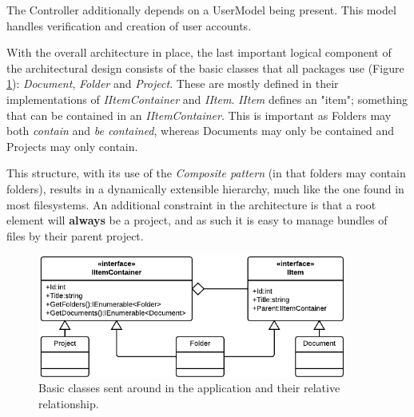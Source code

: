 The Controller additionally depends on a UserModel being present. This model handles verification
and creation of user accounts.

With the overall architecture in place, the last important logical component of the architectural design
consists of the basic classes that all packages use (Figure \ref{fig:basic-classes}): \emph{Document},
\emph{Folder} and \emph{Project}. These are mostly defined in their implementations of \emph{IItemContainer}
and \emph{IItem}. \emph{IItem} defines an "item"; something that can be contained in an
\emph{IItemContainer}. This is important as Folders may both \emph{contain} and \emph{be contained},
whereas Documents may only be contained and Projects may only contain.

This structure, with its use of the \emph{Composite pattern} (in that folders may contain folders), results in a
dynamically extensible hierarchy, much like the one found in most filesystems. An additional constraint
in the architecture is that a root element will {\bf always} be a project, and as such it is easy to
manage bundles of files by their parent project.

\begin{figure}[htb]
	\centering
	\includegraphics[width=0.9\textwidth]{Software_architecture/graphics/basic-classes.png}
	\caption{Basic classes sent around in the application and their relative relationship.}
	\label{fig:basic-classes}
\end{figure}
